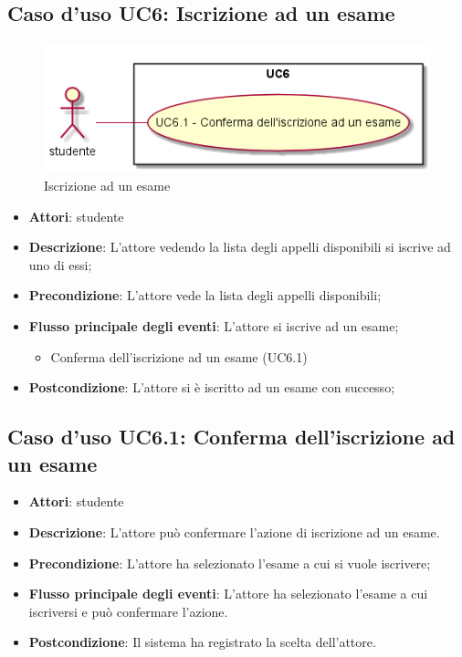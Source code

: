 \subsection{Caso d'uso \texorpdfstring{UC6}{UC6}: Iscrizione ad un esame}
\begin{figure} [H]
\centering
\includegraphics[scale=0.45]{./img/UC6.png}
\caption{Iscrizione ad un esame}\label{}
\end{figure}
\begin{itemize}
\item \textbf{Attori}: studente
\item \textbf{Descrizione}: L'attore vedendo la lista degli appelli disponibili si iscrive ad uno di essi;
\item \textbf{Precondizione}: L'attore vede la lista degli appelli disponibili;
\item \textbf{Flusso principale degli eventi}: L'attore si iscrive ad un esame;
\begin{itemize}
\item Conferma dell'iscrizione ad un esame (UC6.1)
\end{itemize}
\item \textbf{Postcondizione}: L'attore si è iscritto ad un esame con successo;
\end{itemize}
\subsection{Caso d'uso \texorpdfstring{UC6.1}{UC6.1}: Conferma dell'iscrizione ad un esame}
\begin{itemize}
\item \textbf{Attori}: studente
\item \textbf{Descrizione}: L'attore può confermare l'azione di iscrizione ad un esame.
\item \textbf{Precondizione}: L'attore ha selezionato l'esame a cui si vuole iscrivere;
\item \textbf{Flusso principale degli eventi}: L'attore ha selezionato l'esame a cui iscriversi e può confermare l'azione.
\item \textbf{Postcondizione}: Il sistema ha registrato la scelta dell'attore.
\end{itemize}
